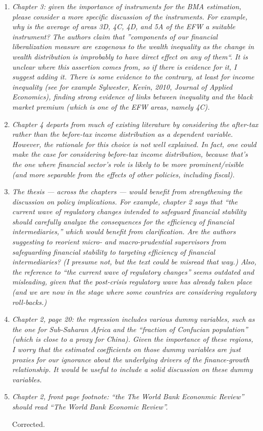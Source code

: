 \begin{enumerate}
    \item \textit{Chapter 3: given the importance of instruments for the BMA estimation, please consider a more specific discussion of the instruments. For example, why is the average of areas 3D, 4C, 4D, and 5A of the EFW a suitable instrument? The authors claim that ''components of our financial liberalization measure are exogenous to the wealth inequality as the change in wealth distribution is improbably to have direct effect on any of them``. It is unclear where this assertion comes from, so if there is evidence for it, I suggest adding it. There is some evidence to the contrary, at least for income inequality (see for example Sylwester, Kevin, 2010, Journal of Applied Economics), finding strong evidence of links between inequality and the black market premium (which is one of the EFW areas, namely 4C).}
    
    \item \textit{Chapter 4 departs from much of existing literature by considering the after-tax rather than the before-tax income distribution as a dependent variable. However, the rationale for this choice is not well explained. In fact, one could make the case for considering before-tax income distribution, because that's the one where financial sector's role is likely to be more prominent/visible (and more separable from the effects of other policies, including fiscal).}
    
    \item \textit{The thesis --- across the chapters --- would benefit from strengthening the discussion on policy implications. For example, chapter 2 says that ``the current wave of regulatory changes intended to safeguard financial stability should carefully analyze the consequences for the efficiency of financial intermediaries,'' which would benefit from clarification. Are the authors suggesting to reorient micro- and macro-prudential supervisors from safeguarding financial stability to targeting efficiency of financial intermediaries? (I presume not, but the text could be misread that way.) Also, the reference to ``the current wave of regulatory changes'' seems outdated and misleading, given that the post-crisis regulatory wave has already taken place (and we are now in the stage where some countries are considering regulatory roll-backs.)}

    \item \textit{Chapter 2, page 20: the regression includes various dummy variables, such as the one for Sub-Saharan Africa and the ``fraction of Confucian population'' (which is close to a proxy for China). Given the importance of these regions, I worry that the estimated coefficients on those dummy variables are just proxies for our ignorance about the underlying drivers of the finance-growth relationship. It would be useful to include a solid discussion on these dummy variables.}
    
    
    \item \textit{Chapter 2, front page footnote: ``the The World Bank Econonmic Review'' should read ``The World Bank Economic Review''.}
    
    Corrected.
\end{enumerate} 